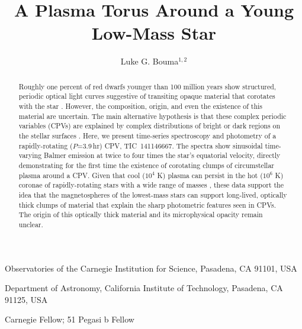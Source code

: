 \documentclass{nature3}
\title{A Plasma Torus Around a Young Low-Mass Star}
\newcommand{\carnegie}{Observatories of the Carnegie Institution for Science, Pasadena, CA 91101, USA}
\newcommand{\caltech}{Department of Astronomy, California Institute of Technology, Pasadena, CA 91125, USA}
\begin{document}
\author{Luke G. Bouma$^{1,2}$}

\maketitle

\scriptsize
\begin{affiliations}
\item \carnegie
\item \caltech
\item Carnegie Fellow; 51 Pegasi b Fellow
\end{affiliations}
\normalsize


\begin{abstract}
\normalfont
Roughly one percent of red dwarfs younger than 100 million years show
structured, periodic optical light curves suggestive of transiting
opaque material that corotates with the star
\cite{Rebull2016,Stauffer2017,Rebull2018,Bouma2024}.  However, the
composition, origin, and even the existence of this material are
uncertain. The main alternative hypothesis is that these complex
periodic variables (CPVs) are explained by complex distributions of
bright or dark regions on the stellar surfaces \cite{Koen2021}.
Here, we present time-series spectroscopy and photometry of a
rapidly-rotating ($P$=3.9\,hr) CPV, TIC~141146667. The spectra show
sinusoidal time-varying Balmer emission at twice to four times the
star's equatorial velocity, directly demonstrating for the first
time the existence of corotating clumps of circumstellar plasma around a CPV.
Given that cool ($10^4$ K) plasma can persist in the hot ($10^6$ K)
coronae of rapidly-rotating stars with a wide range of masses
\cite{CollierCameron1989,Townsend2005,Dunstone2006,Petit2013,Waugh2022,Daley-Yates2024},
these data support the idea that the magnetospheres of the
lowest-mass stars can support long-lived, optically thick
clumps of material that explain the sharp photometric features seen in
CPVs.  The origin of this optically thick material and its
microphysical opacity remain unclear.
\end{abstract}

\maketitle

\end{document}
